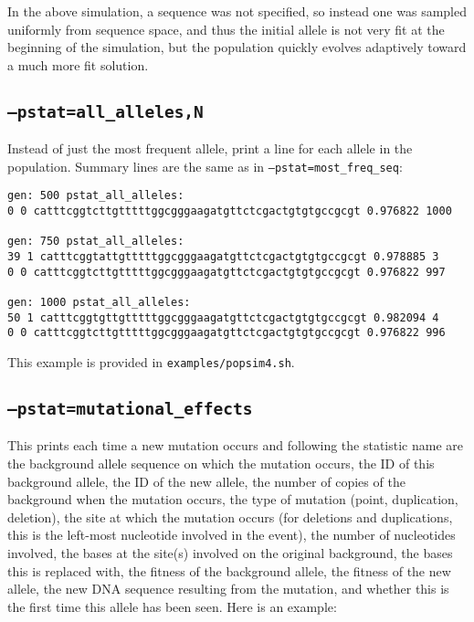 \documentclass[11pt]{article}
\begin{document}
In the above simulation, a sequence was not specified, so instead one was sampled uniformly from sequence space, and thus the initial allele is not very fit at the beginning of the simulation, but the population quickly evolves adaptively toward a much more fit solution.

\subsection{\texttt{--pstat=all\_alleles,N}}

Instead of just the most frequent allele, print a line for each allele in the population. Summary lines are the same as in \texttt{--pstat=most\_freq\_seq}:

\begin{verbatim}
gen: 500 pstat_all_alleles: 
0 0 catttcggtcttgtttttggcgggaagatgttctcgactgtgtgccgcgt 0.976822 1000

gen: 750 pstat_all_alleles: 
39 1 catttcggtattgtttttggcgggaagatgttctcgactgtgtgccgcgt 0.978885 3
0 0 catttcggtcttgtttttggcgggaagatgttctcgactgtgtgccgcgt 0.976822 997

gen: 1000 pstat_all_alleles: 
50 1 catttcggtgttgtttttggcgggaagatgttctcgactgtgtgccgcgt 0.982094 4
0 0 catttcggtcttgtttttggcgggaagatgttctcgactgtgtgccgcgt 0.976822 996
\end{verbatim}

\noindent This example is provided in \texttt{examples/popsim4.sh}.

\subsection{\texttt{--pstat=mutational\_effects}}

This prints each time a new mutation occurs and following the statistic name are the background allele sequence on which the mutation occurs, the ID of this background allele, the ID of the new allele, the number of copies of the background when the mutation occurs, the type of mutation (point, duplication, deletion), the site at which the mutation occurs (for deletions and duplications, this is the left-most nucleotide involved in the event), the number of nucleotides involved, the bases at the site(s) involved on the original background, the bases this is replaced with, the fitness of the background allele, the fitness of the new allele, the new DNA sequence resulting from the mutation, and whether this is the first time this allele has been seen. Here is an example:
\end{document}
